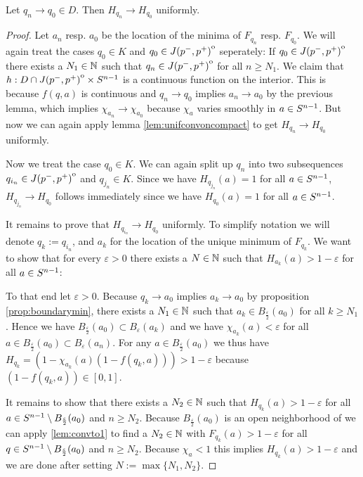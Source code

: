\begin{proposition}
    Let $q_n\to q_0\in D$. Then $H_{q_n}\to H_{q_0}$ uniformly.
\end{proposition}
\begin{proof}
    Let $a_n$ resp. $a_0$ be the location of the minima of $F_{q_n}$ resp. $F_{q_0}$.
    We will again treat the cases $q_0\in K$ and $q_0\in {\kern0ptJ(p^-,p^+)}^{\mathrm{o}}$ seperately:
    If $q_0\in {\kern0ptJ(p^-,p^+)}^{\mathrm{o}}$ there exists a $N_1\in \mathbb{N}$ such that $q_n \in {\kern0ptJ(p^-,p^+)}^{\mathrm{o}}$ for all $n\ge N_1$. We claim that $h:D\cap {\kern0ptJ(p^-,p^+)}^{\mathrm{o}}\times {S^{n-1}}$ is a continuous function on the interior. This is because $f(q,a)$ is continuous and $q_n\to q_0$ implies $a_n\to a_0$ by the previous lemma, which implies $\chi_{a_n}\to \chi_{a_0}$ because $\chi_a$ varies smoothly in $a\in {S^{n-1}}$. But now we can again apply lemma \ref{lem:unifconvoncompact} to get $H_{q_n}\to H_{q_0}$ uniformly.

    Now we treat the case $q_0\in K$. We can again split up $q_n$ into two subsequences $q_{i_n}\in {\kern0ptJ(p^-,p^+)}^{\mathrm{o}}$ and $q_{j_n}\in K$. Since we have $H_{q_{j_n}}(a)=1$ for all $a\in {S^{n-1}}$, $H_{q_{j_n}}\to H_{q_0}$ follows immediately since we have $H_{q_0}(a)=1$ for all $a\in {S^{n-1}}$.

    It remains to prove that $H_{q_{i_n}}\to H_{q_0}$ uniformly. To simplify notation we will denote $q_k:=q_{i_n}$, and $a_k$ for the location of the unique minimum of $F_{q_k}$. We want to show that for every $\varepsilon>0$ there exists a $N\in \mathbb{N}$ such that $H_{a_k}(a)>1-\varepsilon$ for all $a\in {S^{n-1}}$:

    To that end let $\varepsilon>0$. Because $q_k\to a_0$ implies $a_k\to a_0$ by proposition \ref{prop:boundarymin}, there exists a $N_1\in \mathbb{N}$ such that $a_k\in B_\frac{\varepsilon}{2}(a_0)$ for all $k\ge N_1$. Hence we have $B_\frac{\varepsilon}{2}(a_0)\subset B_\varepsilon(a_k)$ and we have $\chi_{a_k}(a)<\varepsilon$ for all $a\in B_\frac{\varepsilon}{2}(a_0)\subset B_\varepsilon(a_n)$.
    For any $a\in B_\frac{\varepsilon}{2}(a_0)$ we thus have $H_{q_k} = (1-\chi_{a_k}(a)(1-f(q_k,a))) > 1-\varepsilon$ because $(1-f(q_k,a))\in [0,1]$.

    It remains to show that there exists a $N_2\in \mathbb{N}$ such that $H_{q_k}(a) > 1-\varepsilon$ for all $a\in {S^{n-1}}\setminus B_\frac{\varepsilon}{2}(a_0)$ and $n\ge N_2$. Because $B_\frac{\varepsilon}{2}(a_0)$ is an open neighborhood of we can apply \ref{lem:convto1} to find a $N_2\in \mathbb{N}$ with $F_{q_k}(a) > 1-\varepsilon$ for all $q\in {S^{n-1}} \setminus B_\frac{\varepsilon}{2}(a_0)$ and $n \ge N_2$. Because $\chi_{a}<1$ this implies $H_{q_k}(a) > 1-\varepsilon$ and we are done after setting $N:= \max \{N_1,N_2\}$.
\end{proof}

